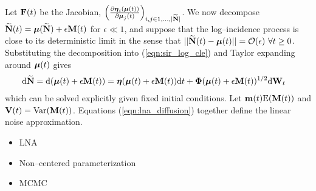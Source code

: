 Let $ \mathbf{F}(t) $ be the Jacobian, $ \left (\frac{\partial\boldsymbol{\eta}_i(\boldsymbol{\mu}(t))}{\partial\boldsymbol{\mu}_j(t)}\right )_{i,j\in{1,\dots,|\widetilde{\mathbf{N}}|}} $. We now decompose $ \widetilde{\mathbf{N}}(t) =  \boldsymbol{\mu}(\widetilde{\mathbf{N}}) + \epsilon\mathbf{M}(t)$ for $ \epsilon \ll 1 $, and suppose that the log--incidence process is close to its deterministic limit in the sense that $ ||\widetilde{\mathbf{N}}(t) - \boldsymbol{\mu}(t)|| = \mathcal{O}(\epsilon)\ \forall t\geq 0$. Substituting the decomposition into (\ref{eqn:sir_log_cle}) and Taylor expanding around $ \boldsymbol{\mu}(t) $ gives
\begin{align}
\label{eqn:lna_diffusion}
\mathrm{d}\widetilde{\mathbf{N}} &= \mathrm{d}(\boldsymbol{\mu}(t) + \epsilon\mathbf{M}(t)) = \boldsymbol{\eta}(\boldsymbol{\mu}(t) + \epsilon\mathbf{M}(t))\mathrm{d} t + \boldsymbol{\Phi}(\boldsymbol{\mu}(t) + \epsilon\mathbf{M}(t))^{1/2}\mathrm{d}\mathbf{W}_t
\end{align} 
which can be solved explicitly given fixed initial conditions. Let $ \mathbf{m}(t) \mathrm{E}(\mathbf{M}(t))$ and $ \mathbf{V}(t) = \mathrm{Var}(\mathbf{M}(t)) $.  
Equations (\ref{eqn:lna_diffusion}) together define the linear noise approximation. 

\begin{itemize}

	\item LNA
	\item Non--centered parameterization
	\item MCMC
\end{itemize}